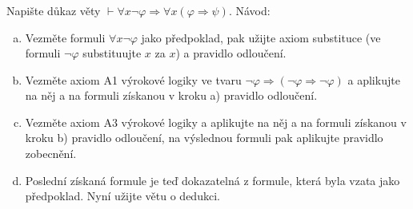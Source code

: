\subsubsection{}
Napište důkaz věty $\vdash \forall x \neg \varphi \Rightarrow \forall x (\varphi \Rightarrow \psi)$. Návod:
\begin{enumerate}[a)]
	\item Vezměte formuli $\forall x \neg \varphi$ jako předpoklad, pak užijte
    axiom substituce (ve formuli $\neg \varphi$ substituujte $x$ za $x$) a
    pravidlo odloučení.
  \item Vezměte axiom A1 výrokové logiky ve tvaru $\neg \varphi \Rightarrow
    (\neg \varphi \Rightarrow \neg \varphi)$ a aplikujte na něj a na formuli
    získanou v kroku a) pravidlo odloučení.
  \item Vezměte axiom A3 výrokové logiky a aplikujte na něj a na formuli
    získanou v kroku b) pravidlo odloučení, na výslednou formuli pak aplikujte
    pravidlo zobecnění.
  \item Poslední získaná formule je teď dokazatelná z formule, která byla vzata
    jako předpoklad. Nyní užijte větu o dedukci.
\end{enumerate}
